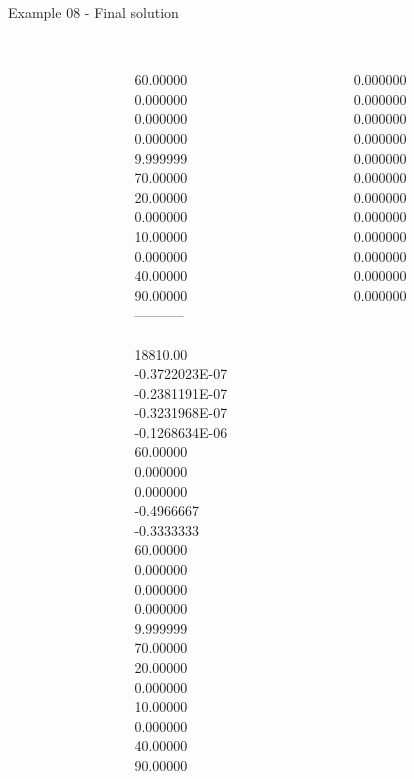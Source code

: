 \begin{frame}{Example 08 - Final solution}
\begin{columns}[t]
\begin{column}{0.3\textwidth}
\end{column}
\begin{column}{0.3\textwidth}
\\
60.00000\\
0.000000\\
0.000000\\
0.000000\\
9.999999\\
70.00000\\
20.00000\\
0.000000\\
10.00000\\
0.000000\\
40.00000\\
90.00000\\
-----------\\
\\
18810.00\\
-0.3722023E-07\\
-0.2381191E-07\\
-0.3231968E-07\\
-0.1268634E-06\\
60.00000\\
0.000000\\
0.000000\\
-0.4966667\\
-0.3333333\\
60.00000\\
0.000000\\
0.000000\\
0.000000\\
9.999999\\
70.00000\\
20.00000\\
0.000000\\
10.00000\\
0.000000\\
40.00000\\
90.00000\\

\end{column}  

\begin{column}{0.3\textwidth}
\\
0.000000\\
0.000000\\
0.000000\\
0.000000\\
0.000000\\
0.000000\\
0.000000\\
0.000000\\
0.000000\\
0.000000\\
0.000000\\
0.000000\\



\end{column}
\end{columns}
\end{frame}
